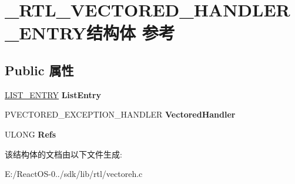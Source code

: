 \hypertarget{struct___r_t_l___v_e_c_t_o_r_e_d___h_a_n_d_l_e_r___e_n_t_r_y}{}\section{\+\_\+\+R\+T\+L\+\_\+\+V\+E\+C\+T\+O\+R\+E\+D\+\_\+\+H\+A\+N\+D\+L\+E\+R\+\_\+\+E\+N\+T\+R\+Y结构体 参考}
\label{struct___r_t_l___v_e_c_t_o_r_e_d___h_a_n_d_l_e_r___e_n_t_r_y}
\subsection*{Public 属性}
\begin{DoxyCompactItemize}
\item 
\mbox{\label{struct___r_t_l___v_e_c_t_o_r_e_d___h_a_n_d_l_e_r___e_n_t_r_y_a7e28a7dd60065a388dad7f9489ad4440}} 
\hyperlink{struct___l_i_s_t___e_n_t_r_y}{L\+I\+S\+T\+\_\+\+E\+N\+T\+RY} {\bfseries List\+Entry}
\item 
\mbox{\label{struct___r_t_l___v_e_c_t_o_r_e_d___h_a_n_d_l_e_r___e_n_t_r_y_a51705c167d64b2f412e9342c2f4ebe79}} 
P\+V\+E\+C\+T\+O\+R\+E\+D\+\_\+\+E\+X\+C\+E\+P\+T\+I\+O\+N\+\_\+\+H\+A\+N\+D\+L\+ER {\bfseries Vectored\+Handler}
\item 
\mbox{\label{struct___r_t_l___v_e_c_t_o_r_e_d___h_a_n_d_l_e_r___e_n_t_r_y_ac4443e17904ea2e63a8079f3947f8b40}} 
U\+L\+O\+NG {\bfseries Refs}
\end{DoxyCompactItemize}


该结构体的文档由以下文件生成\+:\begin{DoxyCompactItemize}
\item 
E\+:/\+React\+O\+S-\/0../sdk/lib/rtl/vectoreh.\+c\end{DoxyCompactItemize}
